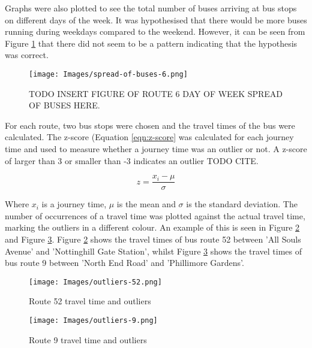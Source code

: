 Graphs were also plotted to see the total number of buses arriving at bus stops on different days of the week. It was hypothesised that there would be more buses running during weekdays compared to the weekend. However, it can be seen from Figure \ref{fig:spread-of-buses-over-week-6} that there did not seem to be a pattern indicating that the hypothesis was correct.

\begin{figure}[H]
\begin{center}
    \texttt{[image: Images/spread-of-buses-6.png]}
    \caption{TODO INSERT FIGURE OF ROUTE 6 DAY OF WEEK SPREAD OF BUSES HERE.}
    \label{fig:spread-of-buses-over-week-6}
\end{center}
\end{figure}

For each route, two bus stops were chosen and the travel times of the bus were calculated. The z-score (Equation \ref{eqn:z-score} was calculated for each journey time and used to measure whether a journey time was an outlier or not. A z-score of larger than 3 or smaller than -3 indicates an outlier TODO CITE. 

\begin{equation}
    z = \frac{x_i - \mu}{\sigma}
    \label{eqn:z-score}
\end{equation}

\noindent Where $x_i$ is a journey time, $\mu$ is the mean and $\sigma$ is the standard deviation. The number of occurrences of a travel time was plotted against the actual travel time, marking the outliers in a different colour. An example of this is seen in Figure \ref{fig:outlier-occurences-52} and Figure \ref{fig:outlier-occurences-9}. Figure \ref{fig:outlier-occurences-52} shows the travel times of bus route 52 between 'All Souls Avenue' and 'Nottinghill Gate Station', whilst Figure \ref{fig:outlier-occurences-9} shows the travel times of bus route 9 between 'North End Road' and 'Phillimore Gardens'. 

\begin{figure}[H]
\begin{center}
    \texttt{[image: Images/outliers-52.png]}
    \caption{Route 52 travel time and outliers}
    \label{fig:outlier-occurences-52}
\end{center}
\end{figure}

\begin{figure}[H]
\begin{center}
    \texttt{[image: Images/outliers-9.png]}
    \caption{Route 9 travel time and outliers}
    \label{fig:outlier-occurences-9}
\end{center}
\end{figure}


